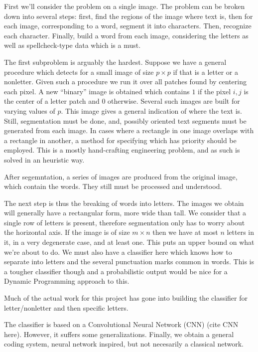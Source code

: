 \documentclass[12pt,a4paper,oneside,english]{UPBThesis}
\newcommand{\hctimes}[2]{{#1}\!\times\!{#2}}
\begin{document}
First we'll consider the problem on a single image. The problem can be broken down into several steps: first, find the regions of the image where text is, then for each image, corresponding to a word, segment it into characters. Then, recognize each character. Finally, build a word from each image, considering the letters as well as spellcheck-type data which is a must.

The first subproblem is arguably the hardest. Suppose we have a general procedure which detects for a small image of size $\hctimes{p}{p}$ if that is a letter or a nonletter. Given such a procedure we run it over all patches found by centering each pixel. A new ``binary'' image is obtained which contains $1$ if the pixel $i,j$ is the center of a letter patch and $0$ otherwise. Several such images are built for varying values of $p$. This image gives a general indication of where the text is. Still, segmentation must be done, and, possibly oriented text segments must be generated from each image. In cases where a rectangle in one image overlaps with a rectangle in another, a method for specifying which has priority should be employed. This is a mostly hand-crafting engineering problem, and as such is solved in an heuristic way.

After segemntation, a series of images are produced from the original image, which contain the words. They still must be processed and understood.

The next step is thus the breaking of words into letters. The images we obtain will generally have a rectangular form, more wide than tall. We consider that a single row of letters is present, therefore segmentation only has to worry about the horizontal axis. If the image is of size $\hctimes{m}{n}$ then we have at most $n$ letters in it, in a very degenerate case, and at least one. This puts an upper bound on what we're about to do. We must also have a classifier here which knows how to separate into letters and the several punctuation marks common in words. This is a tougher classifier though and a probabilistic output would be nice for a Dynamic Programming approach to this.

Much of the actual work for this project has gone into building the classifier for letter/nonletter and then specific letters.

The classifier is based on a Convolutional Neural Network (CNN) (cite CNN here). However, it suffers some generalizations. Finally, we obtain a general coding system, neural network inspired, but not necesarily a classical network.
\end{document}
